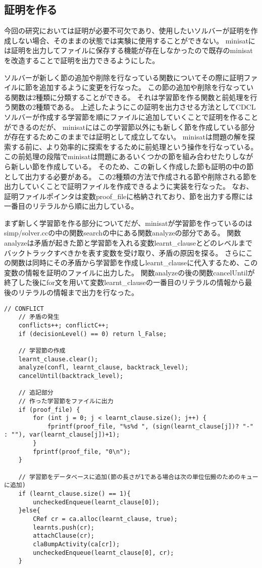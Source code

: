 \subsection{証明を作る}



今回の研究においては証明が必要不可欠であり、使用したいソルバーが証明を作成しない場合、そのままの状態では実験に使用することができない。
minisatには証明を出力してファイルに保存する機能が存在しなかったので既存のminisatを改造することで証明を出力できるようにした。

ソルバーが新しく節の追加や削除を行なっている関数についてその際に証明ファイルに節を追加するように変更を行なった。
この節の追加や削除を行なっている関数は2種類に分類することができる。
それは学習節を作る関数と前処理を行う関数の2種類である。
上述したようにこの証明を出力させる方法としてCDCLソルバーが作成する学習節を順にファイルに追加していくことで証明を作ることができるのだが、
minisatにはこの学習節以外にも新しく節を作成している部分が存在するためこのままでは証明として成立してない。
minisatは問題の解を探索する前に、より効率的に探索をするために前処理という操作を行なっている。
この前処理の段階でminisatは問題にあるいくつかの節を組み合わせたりしながら新しい節を作成している。
そのため、この新しく作成した節も証明の中の節として出力する必要がある。
この2種類の方法で作成される節や削除される節を出力していくことで証明ファイルを作成できるように実装を行なった。
なお、証明ファイルポインタは変数proof\_fileに格納されており、節を出力する際には一番目のリテラルから順に出力している。

まず新しく学習節を作る部分についてだが、minisatが学習節を作っているのはsimp/solver.ccの中の関数searchの中にある関数analyzeの部分である。
関数analyzeは矛盾が起きた節と学習節を入れる変数learnt\_clauseとどのレベルまでバックトラックすべきかを表す変数を受け取り、矛盾の原因を探る。
さらにこの関数は同時にその矛盾から学習節を作成しlearnt\_clauseに代入するため、この変数の情報を証明のファイルに出力した。
関数analyzeの後の関数cancelUntilが終了した後にfor文を用いて変数learnt\_clauseの一番目のリテラルの情報から最後のリテラルの情報まで出力を行なった。
\begin{lstlisting}[caption=関数analyzeの変更(core/solver.cc), firstnumber=296]
	// CONFLICT
	// 矛盾の発生
    conflicts++; conflictC++;
    if (decisionLevel() == 0) return l_False;

	// 学習節の作成
    learnt_clause.clear();
    analyze(confl, learnt_clause, backtrack_level);
    cancelUntil(backtrack_level);
    
	// 追記部分
	// 作った学習節をファイルに出力
    if (proof_file) {
        for (int j = 0; j < learnt_clause.size(); j++) {
			fprintf(proof_file, "%s%d ", (sign(learnt_clause[j])? "-" : ""), var(learnt_clause[j])+1); 
        }
        fprintf(proof_file, "0\n");
    }

	// 学習節をデータベースに追加(節の長さが1である場合は次の単位伝搬のためのキューに追加)
	if (learnt_clause.size() == 1){
        uncheckedEnqueue(learnt_clause[0]);
    }else{
        CRef cr = ca.alloc(learnt_clause, true);
        learnts.push(cr);
        attachClause(cr);
        claBumpActivity(ca[cr]);
        uncheckedEnqueue(learnt_clause[0], cr);
    }
\end{lstlisting}

